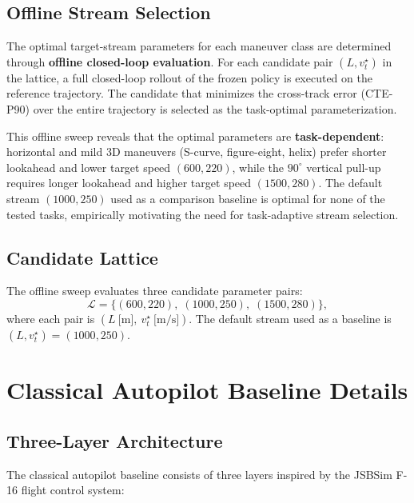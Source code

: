 \documentclass{article}
\begin{document}
\subsection{Offline Stream Selection}

The optimal target-stream parameters for each maneuver class are
determined through \textbf{offline closed-loop evaluation}.  For each
candidate pair $(L, v_t^\star)$ in the lattice, a full closed-loop
rollout of the frozen policy is executed on the reference trajectory.
The candidate that minimizes the cross-track error (CTE-P90) over the
entire trajectory is selected as the task-optimal parameterization.

This offline sweep reveals that the optimal parameters are
\textbf{task-dependent}: horizontal and mild 3D maneuvers
(S-curve, figure-eight, helix) prefer shorter lookahead and lower
target speed $(600, 220)$, while the $90^\circ$ vertical pull-up
requires longer lookahead and higher target speed $(1500, 280)$.
The default stream $(1000, 250)$ used as a comparison baseline is
optimal for none of the tested tasks, empirically motivating the
need for task-adaptive stream selection.

\subsection{Candidate Lattice}

The offline sweep evaluates three candidate parameter pairs:
\begin{equation}
  \mathcal{L} = \{(600, 220),\; (1000, 250),\; (1500, 280)\},
\end{equation}
where each pair is $(L\ \text{[m]},\ v_t^\star\ \text{[m/s]})$.
The default stream used as a baseline is $(L, v_t^\star) = (1000, 250)$.

\section{Classical Autopilot Baseline Details}
\label{app:classical}

\subsection{Three-Layer Architecture}

The classical autopilot baseline consists of three layers inspired by
the JSBSim F-16 flight control system:
\end{document}
